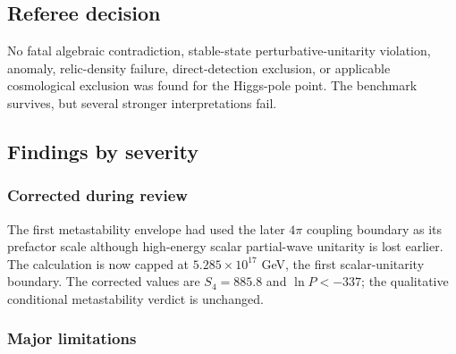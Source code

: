 \documentclass[
]{article}
\begin{document}
\hypertarget{referee-decision}{%
\subsection{Referee decision}\label{referee-decision}}

No fatal algebraic contradiction, stable-state perturbative-unitarity
violation, anomaly, relic-density failure, direct-detection exclusion,
or applicable cosmological exclusion was found for the Higgs-pole point.
The benchmark survives, but several stronger interpretations fail.

\hypertarget{findings-by-severity}{%
\subsection{Findings by severity}\label{findings-by-severity}}

\hypertarget{corrected-during-review}{%
\subsubsection{Corrected during review}\label{corrected-during-review}}

The first metastability envelope had used the later \(4\pi\) coupling
boundary as its prefactor scale although high-energy scalar partial-wave
unitarity is lost earlier. The calculation is now capped at
\(5.285\times10^{17}\) GeV, the first scalar-unitarity boundary. The
corrected values are \(S_4=885.8\) and \(\ln P<-337\); the qualitative
conditional metastability verdict is unchanged.

\hypertarget{major-limitations}{%
\subsubsection{Major limitations}\label{major-limitations}}
\end{document}
